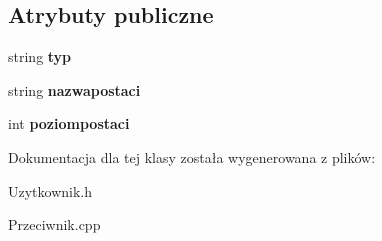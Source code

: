 \subsection*{Atrybuty publiczne}
\begin{DoxyCompactItemize}
\item 
string {\bfseries typ}\hypertarget{class_przeciwnik_a40151e7196a294d2a417dd1da5bb7390}{}\label{class_przeciwnik_a40151e7196a294d2a417dd1da5bb7390}

\item 
string {\bfseries nazwapostaci}\hypertarget{class_przeciwnik_a5890b728264911f16538cc321242de92}{}\label{class_przeciwnik_a5890b728264911f16538cc321242de92}

\item 
int {\bfseries poziompostaci}\hypertarget{class_przeciwnik_a1c475fc41c7f49cb7e59da7b3a500a07}{}\label{class_przeciwnik_a1c475fc41c7f49cb7e59da7b3a500a07}

\end{DoxyCompactItemize}


Dokumentacja dla tej klasy została wygenerowana z plików\+:\begin{DoxyCompactItemize}
\item 
Uzytkownik.\+h\item 
Przeciwnik.\+cpp\end{DoxyCompactItemize}

